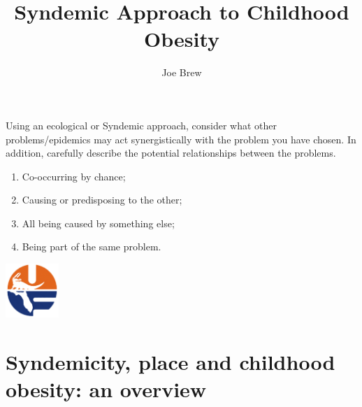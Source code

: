 \documentclass[11pt]{article}
\begin{document}


\title{\textbf{Syndemic Approach to Childhood Obesity}}
\author{Joe Brew}


\maketitle

\noindent
Using an ecological or Syndemic approach, consider what other problems/epidemics may act synergistically with the problem you have chosen.  
In addition, carefully describe the potential relationships between the problems.
\begin{enumerate}
\item Co-occurring by chance;
\item Causing or predisposing to the other;
\item  All being caused by something else;
\item Being part of the same problem.
\end{enumerate}


\tableofcontents

\vspace{20mm}

\begin{center}
\includegraphics[width=2cm]{uf}
\end{center}




\section*{Syndemicity, place and childhood obesity: an overview}
\hrulefill
\end{document}
